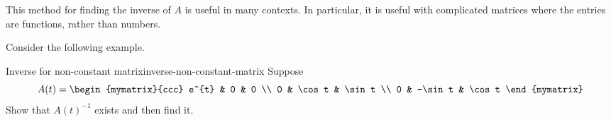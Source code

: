 
This method for finding the inverse of $A$ is useful in many
contexts. In particular, it is useful with complicated matrices where
the entries are functions, rather than numbers.

Consider the following example.

\begin{example}{Inverse for non-constant matrix}{inverse-non-constant-matrix}
  Suppose
  \begin{equation*}
    A(t) =\begin{mymatrix}{ccc}
      e^{t} & 0 & 0 \\
      0 & \cos t & \sin t \\
      0 & -\sin t & \cos t
    \end{mymatrix}
  \end{equation*}
  Show that $A(t) ^{-1}$ exists and then find it.
\end{example}

